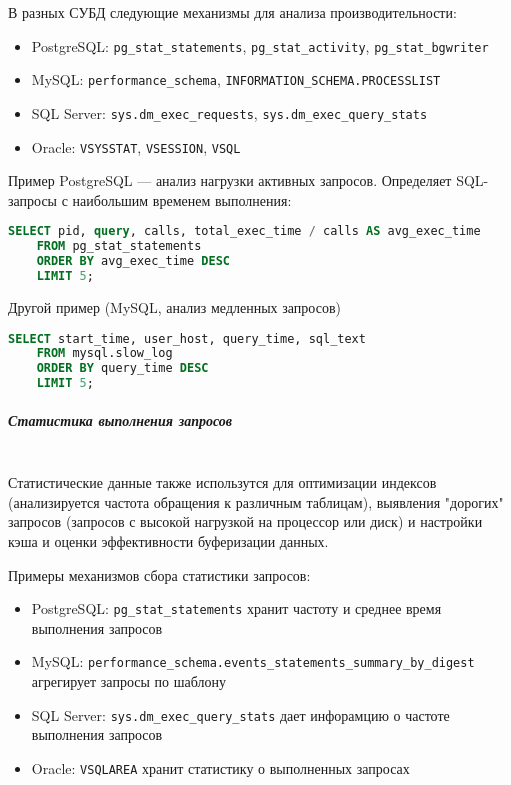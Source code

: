 В разных СУБД следующие механизмы для анализа производительности:
\begin{itemize}
    \item PostgreSQL: \texttt{pg\_stat\_statements}, \texttt{pg\_stat\_activity}, \texttt{pg\_stat\_bgwriter} \autocite[§27.2]{PostgreSQLdocc27}
    \item MySQL: \texttt{performance\_schema}, \texttt{INFORMATION\_SCHEMA.PROCESSLIST} \autocite{Mysqldoc2}
    \item SQL Server: \texttt{sys.dm\_exec\_requests}, \texttt{sys.dm\_exec\_query\_stats} \autocite{MicrosoftLearnSQLserverSysDymView}
    \item Oracle: \texttt{V\textdollar SYSSTAT}, \texttt{V\textdollar SESSION}, \texttt{V\textdollar SQL} \autocite[c. 9 §9.98, §9.17, §9.46]{oracledbdoc2}
\end{itemize}

Пример PostgreSQL — анализ нагрузки активных запросов. Определяет SQL-запросы с наибольшим временем выполнения:
\begin{lstlisting}[language=SQL]
    SELECT pid, query, calls, total_exec_time / calls AS avg_exec_time
    FROM pg_stat_statements
    ORDER BY avg_exec_time DESC
    LIMIT 5;        
\end{lstlisting}

Другой пример (MySQL, анализ медленных запросов)
\begin{lstlisting}[language=SQL]
    SELECT start_time, user_host, query_time, sql_text
    FROM mysql.slow_log
    ORDER BY query_time DESC
    LIMIT 5;        
\end{lstlisting}

\subparagraph{Статистика выполнения запросов} ~\\

Статистические данные также использутся для оптимизации индексов (анализируется частота обращения к различным таблицам), выявления "дорогих" запросов (запросов с высокой нагрузкой на процессор или диск) и настройки кэша и оценки эффективности буферизации данных.

Примеры механизмов сбора статистики запросов:
\begin{itemize}
    \item PostgreSQL: \texttt{pg\_stat\_statements} хранит частоту и среднее время выполнения запросов
    \item MySQL: \texttt{performance\_schema.events\_statements\_summary\_by\_digest} агрегирует запросы по шаблону
    \item SQL Server: \texttt{sys.dm\_exec\_query\_stats} дает инфорамцию о частоте выполнения запросов
    \item Oracle: \texttt{V\textdollar SQLAREA} хранит статистику о выполненных запросах
\end{itemize}

